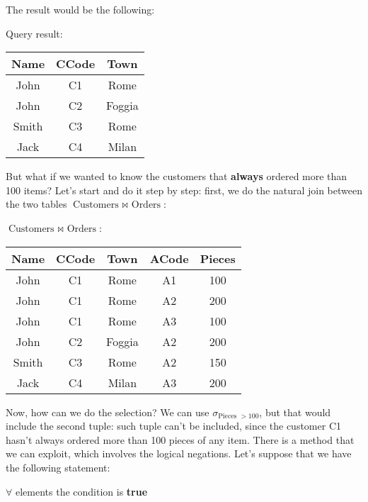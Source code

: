 The result would be the following:
\begin{center}
    Query result: \quad \begin{tabular}{|c|c|c|}
        \hline \rowcolor{maindoccol!60}
        \textbf{Name} & \textbf{CCode} & \textbf{Town} \\
        \hline
        John & C1 & Rome \\
        \hline
        John & C2 & Foggia \\
        \hline
        Smith & C3 & Rome \\
        \hline
        Jack & C4 & Milan \\
        \hline
    \end{tabular}
\end{center}

But what if we wanted to know the customers that \textbf{always} ordered more than 100 items? Let's start and do it step by step: first, we do the natural join between the two tables $\text{Customers } \bowtie \text{ Orders}$:

\begin{center}
    $\text{Customers } \bowtie \text{ Orders}$: \quad \begin{tabular}{|c|c|c|c|c|}
        \hline \rowcolor{maindoccol!60}
        \textbf{Name} & \textbf{CCode} & \textbf{Town} & \textbf{ACode} & \textbf{Pieces} \\
        \hline
        John & C1 & Rome & A1 & 100 \\
        \hline
        John & C1 & Rome & A2 & 200 \\
        \hline
        John & C1 & Rome & A3 & 100 \\
        \hline
        John & C2 & Foggia & A2 & 200 \\
        \hline
        Smith & C3 & Rome & A2 & 150 \\
        \hline
        Jack & C4 & Milan & A3 & 200 \\
        \hline
    \end{tabular}
\end{center}

Now, how can we do the selection? We can use $\sigma_{\text{Pieces } > 100}$, but that would include the second tuple: such tuple can't be included, since the customer C1 hasn't always ordered more than 100 pieces of any item. There is a method that we can exploit, which involves the logical negations.
\nwl
Let's suppose that we have the following statement:
\begin{center}
    $\forall$ elements the condition is \textbf{true}
\end{center}

